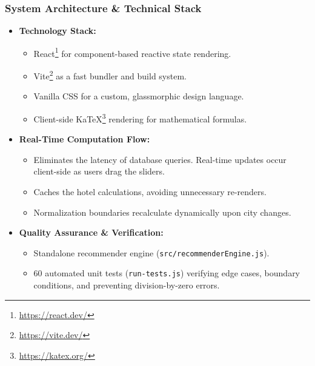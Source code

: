 \begin{frame}
    \frametitle{System Architecture \& Technical Stack}
    \begin{itemize}
        \item \textbf{Technology Stack:}
            \begin{itemize}
                \item React\footnote{\url{https://react.dev/}} for component-based reactive state rendering.
                \item Vite\footnote{\url{https://vite.dev/}} as a fast bundler and build system.
                \item Vanilla CSS for a custom, glassmorphic design language.
                \item Client-side KaTeX\footnote{\url{https://katex.org/}} rendering for mathematical formulas.
            \end{itemize}
        \item \textbf{Real-Time Computation Flow:}
            \begin{itemize}
                \item Eliminates the latency of database queries. Real-time updates occur client-side as users drag the sliders.
                \item Caches the hotel calculations, avoiding unnecessary re-renders.
                \item Normalization boundaries recalculate dynamically upon city changes.
            \end{itemize}
        \item \textbf{Quality Assurance \& Verification:}
            \begin{itemize}
                \item Standalone recommender engine (\texttt{src/recommenderEngine.js}).
                \item 60 automated unit tests (\texttt{run-tests.js}) verifying edge cases, boundary conditions, and preventing division-by-zero errors.
            \end{itemize}
    \end{itemize}
\end{frame}

